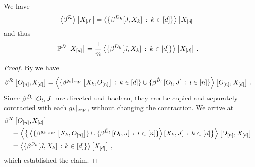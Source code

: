 \begin{theorem}
    \label{the:extractionDataCores}
    We have
    \begin{align*}
        \left\langle \beta^{\mathcal{R}}\right\rangle \left[ X_{[d]} \right]
        = \left\langle \{\beta^{D_{k}}[J,X_{k}] \,:\, k\in[d]\}\right\rangle \left[ X_{[d]} \right]
    \end{align*}
    and thus
    \begin{align*}
        \mathbb{P}^{D}\left[X_{[d]}\right]
        = \frac{1}{m} \left\langle \{\beta^{D_{k}}[J,X_{k}]  \,:\, k\in[d]\}\right\rangle \left[ X_{[d]} \right] \, .
    \end{align*}
\end{theorem}
\begin{proof}
    By  we have
    \begin{align*}
        \beta^{\mathcal{R}}\left[O_{[n]},X_{[d]}\right] =
        \left\langle 
            \{\beta^{{g_{k}}|_{x_{W}}}\left[X_{k},O_{[n]}\right] \,:\, k\in[d]\}
            \cup \{\beta^{\tilde{D}_{l}}\left[O_{l},J\right] \,:\, l\in[n]\}
        \right\rangle \left[ O_{[n]},X_{[d]} \right] \, .
    \end{align*}
    Since $\beta^{\tilde{D}_{l}}\left[O_{l},J\right]$ are directed and boolean, they can be copied and separately contracted with each ${g_{k}}|_{x_{W}}$, without changing the contraction.
    We arrive at
    \begin{align*}
        &\beta^{\mathcal{R}}\left[O_{[n]},X_{[d]}\right] \\
        &\quad = \left\langle 
            \big\{\left\langle 
                \{\beta^{{g_{k}}|_{x_{W}}}\left[X_{k},O_{[n]}\right]\}
                \cup \{\beta^{\tilde{D}_{l}}\left[O_{l},J\right] \,:\, l\in[n]\}
            \right\rangle \left[ X_{k},J \right] \,:\, k\in[d] \big\}
        \right\rangle \left[ O_{[n]},X_{[d]} \right] \\
        & \quad =  \left\langle \{\beta^{D_{k}}[J,X_{k}]  \,:\, k\in[d]\}\right\rangle \left[ X_{[d]} \right] \, ,
    \end{align*}
    which established the claim.
\end{proof}

